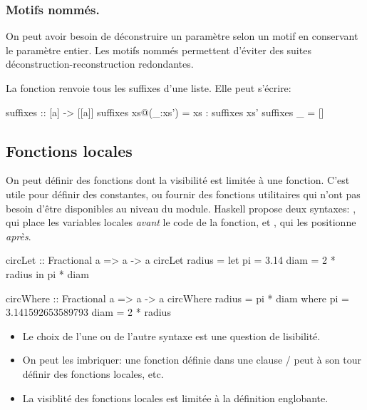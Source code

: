 \subsubsection{Motifs nommés.}
\label{as-patterns}

On peut avoir besoin de déconstruire un paramètre selon un motif en conservant le paramètre entier. Les motifs nommés permettent d'éviter des suites déconstruction-reconstruction redondantes.

La fonction  \parencite[103]{OSullivan2008} renvoie tous les suffixes d'une liste. Elle peut s'écrire:

\begin{haskellcode}
suffixes :: [a] -> [[a]]
suffixes xs@(_:xs') = xs : suffixes xs'
suffixes _ = []
\end{haskellcode}

\subsection{Fonctions locales}

On peut définir des fonctions dont la visibilité est limitée à une fonction. C'est utile pour définir des constantes, ou fournir des fonctions utilitaires qui n'ont pas besoin d'être disponibles au niveau du module. Haskell propose deux syntaxes: , qui place les variables locales \emph{avant} le code de la fonction, et ,  qui les positionne \emph{après}.

\begin{halfwidth}
\begin{haskellcode}
circLet :: Fractional a => a -> a
circLet radius = let pi   = 3.14
                     diam = 2 * radius
                 in pi * diam
\end{haskellcode}
\end{halfwidth}\hfill%
\begin{halfwidth}
	\begin{haskellcode}
circWhere :: Fractional a => a -> a
circWhere radius = pi * diam
    where pi   = 3.141592653589793
          diam = 2 * radius
	\end{haskellcode}
\end{halfwidth}

\begin{itemize}
\item Le choix de l'une ou de l'autre syntaxe est une question de lisibilité.
\item On peut les imbriquer: une fonction définie dans une clause / peut à son tour définir des fonctions locales, etc.
\item La visiblité des fonctions locales est limitée à la définition englobante.
\end{itemize}

